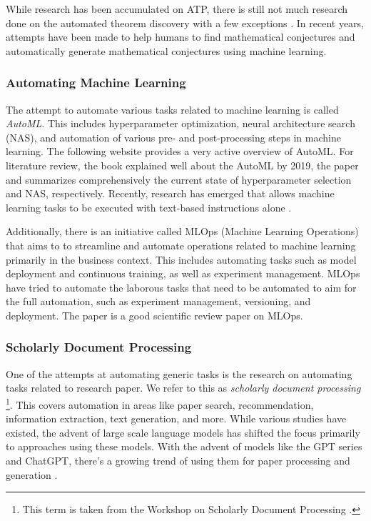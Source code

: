 While research has been accumulated on ATP, there is still not much research done on the automated theorem discovery with a few exceptions \cite{gao2014systematic}. In recent years, attempts have been made to help humans to find mathematical conjectures \cite{davies2021advancing} and
automatically generate mathematical conjectures \cite{raayoni2021generating}  using machine learning.

\subsubsection{Automating Machine Learning}
The attempt to automate various tasks related to machine learning is called \textit{AutoML}. This includes hyperparameter optimization, neural architecture search (NAS), and automation of various pre- and post-processing steps in machine learning. The following website \cite{automlorg} provides a very active overview of AutoML. For literature review, the book \cite{hutter2019automated} explained well about the AutoML by 2019, the paper \cite{bischl2023hyperparameter} and \cite{lindauer2020best,white2023neural} summarizes comprehensively the current state of hyperparameter selection and NAS, respectively. Recently, research has emerged that allows machine learning tasks to be executed with text-based instructions alone \cite{vijay2023prompt}.

Additionally, there is an initiative called MLOps (Machine Learning Operations) that aims to to streamline and automate operations related to machine learning primarily in the business context. This includes automating tasks such as model deployment and continuous training, as well as experiment management. MLOps have tried to automate the laborous tasks that need to be automated to aim for the full automation, such as experiment management, versioning, and deployment. The paper \cite{kreuzberger2023machine} is a good scientific review paper on MLOps.

\subsubsection{Scholarly Document Processing}
One of the attempts at automating generic tasks is the research on automating tasks related to research paper. We refer to this as \textit{scholarly document processing} \footnote{
This term is taken from the Workshop on Scholarly Document Processing \cite{wssdp}.
}. This covers automation in areas like paper search, recommendation, information extraction, text generation, and more. While various studies have existed, the advent of large scale language models has shifted the focus primarily to approaches using these models. With the advent of models like the GPT series \cite{openai2023gpt} and ChatGPT, there's a growing trend of using them for paper processing \cite{elicit,scispace} and generation \cite{transformer2022can}.

